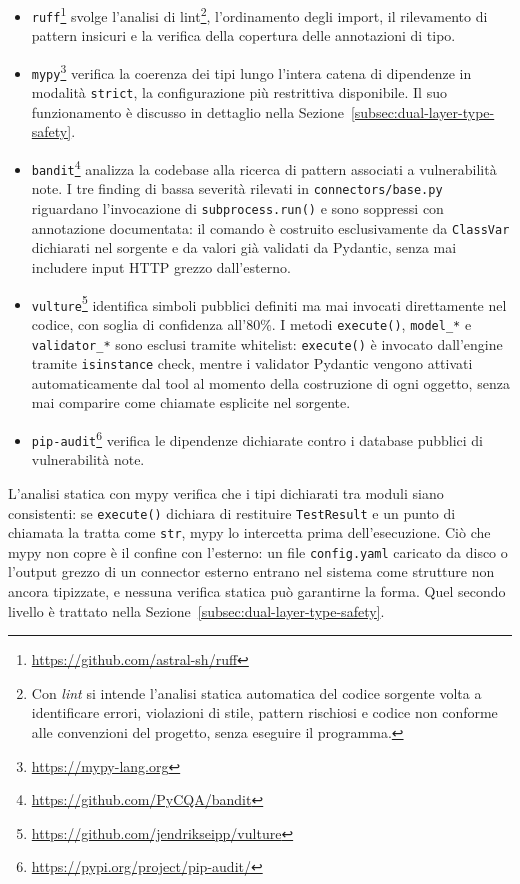 \begin{itemize}
      \item \texttt{ruff}\footnote{\url{https://github.com/astral-sh/ruff}} svolge l'analisi di lint\footnote{Con \emph{lint} si intende l'analisi statica automatica del codice sorgente volta a identificare errori, violazioni di stile, pattern rischiosi e codice non conforme alle convenzioni del progetto, senza eseguire il programma.}, l'ordinamento degli import, il rilevamento di pattern insicuri e la verifica della copertura delle annotazioni di tipo.

      \item \texttt{mypy}\footnote{\url{https://mypy-lang.org}} verifica la coerenza dei tipi lungo l'intera catena di dipendenze in modalità \texttt{strict}, la configurazione più restrittiva disponibile. Il suo funzionamento è discusso in dettaglio nella Sezione~\ref{subsec:dual-layer-type-safety}.

      \item \texttt{bandit}\footnote{\url{https://github.com/PyCQA/bandit}} analizza la codebase alla ricerca di pattern associati a vulnerabilità note. I tre finding di bassa severità rilevati in \texttt{connectors/base.py} riguardano l'invocazione di \texttt{subprocess.run()} e sono soppressi con annotazione documentata: il comando è costruito esclusivamente da \texttt{ClassVar} dichiarati nel sorgente e da valori già validati da Pydantic, senza mai includere input \gls{HTTP} grezzo dall'esterno.

      \item \texttt{vulture}\footnote{\url{https://github.com/jendrikseipp/vulture}} identifica simboli pubblici definiti ma mai invocati direttamente nel codice, con soglia di confidenza all'80\%. I metodi \texttt{execute()}, \texttt{model\_*} e \texttt{validator\_*} sono esclusi tramite whitelist: \texttt{execute()} è invocato dall'engine tramite \texttt{isinstance} check, mentre i validator Pydantic vengono attivati automaticamente dal tool al momento della costruzione di ogni oggetto, senza mai comparire come chiamate esplicite nel sorgente.

      \item \texttt{pip-audit}\footnote{\url{https://pypi.org/project/pip-audit/}} verifica le dipendenze dichiarate contro i database pubblici di vulnerabilità note.
\end{itemize}



L'analisi statica con mypy verifica che i tipi dichiarati tra moduli siano consistenti: se \texttt{execute()} dichiara di restituire \texttt{TestResult} e un punto di chiamata la tratta come \texttt{str}, mypy lo intercetta prima dell'esecuzione. Ciò che mypy non copre è il confine con l'esterno: un file \texttt{config.yaml} caricato da disco o l'output grezzo di un connector esterno entrano nel sistema come strutture non ancora tipizzate, e nessuna verifica statica può garantirne la forma. Quel secondo livello è trattato nella Sezione~\ref{subsec:dual-layer-type-safety}.


